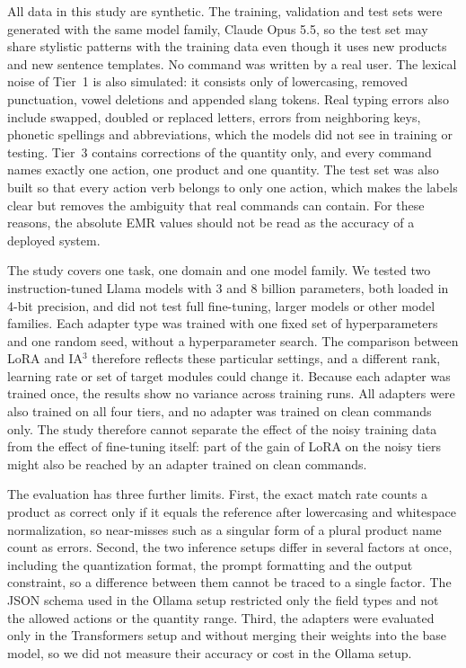 \documentclass[journal,article,submit,pdftex,moreauthors]{Definitions/mdpi}
\begin{document}
All data in this study are synthetic. The training, validation and test sets were generated with the same model family, Claude Opus 5.5, so the test set may share stylistic patterns with the training data even though it uses new products and new sentence templates. No command was written by a real user. The lexical noise of Tier~1 is also simulated: it consists only of lowercasing, removed punctuation, vowel deletions and appended slang tokens. Real typing errors also include swapped, doubled or replaced letters, errors from neighboring keys, phonetic spellings and abbreviations, which the models did not see in training or testing. Tier~3 contains corrections of the quantity only, and every command names exactly one action, one product and one quantity. The test set was also built so that every action verb belongs to only one action, which makes the labels clear but removes the ambiguity that real commands can contain. For these reasons, the absolute EMR values should not be read as the accuracy of a deployed system.

The study covers one task, one domain and one model family. We tested two instruction-tuned Llama models with 3 and 8 billion parameters, both loaded in 4-bit precision, and did not test full fine-tuning, larger models or other model families. Each adapter type was trained with one fixed set of hyperparameters and one random seed, without a hyperparameter search. The comparison between LoRA and IA$^3$ therefore reflects these particular settings, and a different rank, learning rate or set of target modules could change it. Because each adapter was trained once, the results show no variance across training runs. All adapters were also trained on all four tiers, and no adapter was trained on clean commands only. The study therefore cannot separate the effect of the noisy training data from the effect of fine-tuning itself: part of the gain of LoRA on the noisy tiers might also be reached by an adapter trained on clean commands.

The evaluation has three further limits. First, the exact match rate counts a product as correct only if it equals the reference after lowercasing and whitespace normalization, so near-misses such as a singular form of a plural product name count as errors. Second, the two inference setups differ in several factors at once, including the quantization format, the prompt formatting and the output constraint, so a difference between them cannot be traced to a single factor. The JSON schema used in the Ollama setup restricted only the field types and not the allowed actions or the quantity range. Third, the adapters were evaluated only in the Transformers setup and without merging their weights into the base model, so we did not measure their accuracy or cost in the Ollama setup.
\end{document}
